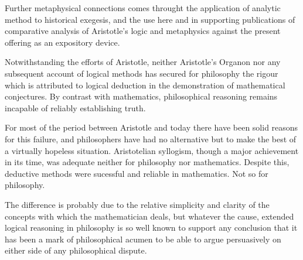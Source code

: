 Further metaphysical connections comes throught the application of
analytic method to historical exegesis, and the use here and in
supporting publications of comparative analysis of Aristotle's logic
and metaphysics against the present offering as an expository device.

Notwithstanding the efforts of Aristotle, neither Aristotle's Organon
nor any subsequent account of logical methods has secured for
philosophy the rigour which is attributed to logical deduction in the
demonstration of mathematical conjectures.
By contrast with mathematics, philosophical reasoning remains
incapable of reliably establishing truth.

For most of the period between Aristotle and today there have been
solid reasons for this failure, and philosophers have had no
alternative but to make the best of a virtually hopeless situation.
Aristotelian syllogism, though a major achievement in its time, was
adequate neither for philosophy nor mathematics.
Despite this, deductive methods were sucessful and reliable in
mathematics.
Not so for philosophy.

The difference is probably due to the relative simplicity and clarity
of the concepts with which the mathematician deals, but whatever the
cause, extended logical reasoning in philosophy is so well known to
support any conclusion that it has been a mark of philosophical acumen
to be able to argue persuasively on either side of any philosophical
dispute.
